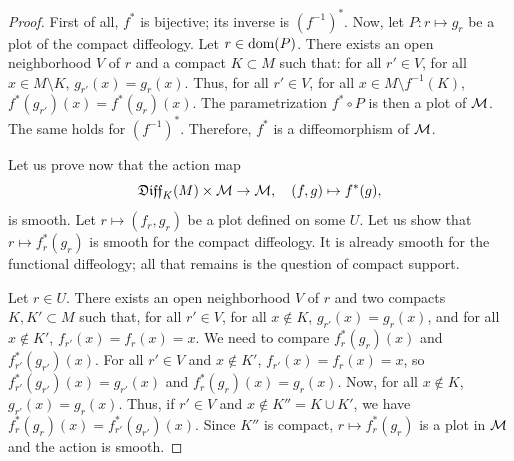 \begin{proof}
  First of all,
  $f^*$ is bijective;
  its inverse is $(f^{-1})^*$.
  Now, let $P \colon r \mapsto g_r$ be a plot of the compact diffeology.
  Let $r \in \mathrm{dom}(P)$.
  There exists an open neighborhood $V$ of $r$ and a compact $K \subset M$ such that:
  for all $r' \in V$,
  for all $x \in M \setminus K$,
  $g_{r'}(x) = g_r(x)$.
  Thus,
  for all $r' \in V$,
  for all $x \in M \setminus f^{-1}(K)$,
  $f^*(g_{r'})(x) = f^*(g_r)(x)$.
  The parametrization $f^* \circ P$ is then a plot of $\mathcal{M}$.
  The same holds for $(f^{-1})^*$.
  Therefore,
  $f^*$ is a diffeomorphism of $\mathcal{M}$.
  
  Let us prove now that the action map
  $$
    \mathfrak{Diff}_K(M) \times \mathcal{M} \to \mathcal{M},
    \quad (f,g) \mapsto f^*(g),
  $$
  is smooth.
  Let $r \mapsto (f_r, g_r)$ be a plot defined on some $U$.
  Let us show that $r \mapsto f_r^*(g_r)$ is smooth for the compact diffeology.
  It is already smooth for the functional diffeology;
  all that remains is the question of compact support.
  
  Let $r \in U$.
  There exists an open neighborhood $V$ of $r$ and two compacts $K, K' \subset M$ such that,
  for all $r' \in V$,
  for all $x \notin K$, $g_{r'}(x) = g_r(x)$,
  and for all $x \notin K'$, $f_{r'}(x) = f_r(x) = x$.
  We need to compare $f_r^*(g_r)(x)$ and $f_{r'}^*(g_{r'})(x)$.
  For all $r' \in V$ and $x \notin K'$,
  $f_{r'}(x) = f_r(x) = x$,
  so $f_{r'}^*(g_{r'})(x) = g_{r'}(x)$ and $f_r^*(g_r)(x) = g_r(x)$.
  Now, for all $x \notin K$,
  $g_{r'}(x) = g_r(x)$.
  Thus,
  if $r' \in V$ and $x \notin K'' = K \cup K'$,
  we have $f_r^*(g_r)(x) = f_{r'}^*(g_{r'})(x)$.
  Since $K''$ is compact,
  $r \mapsto f_r^*(g_r)$ is a plot in $\mathcal{M}$ and the action is smooth.
\end{proof}

